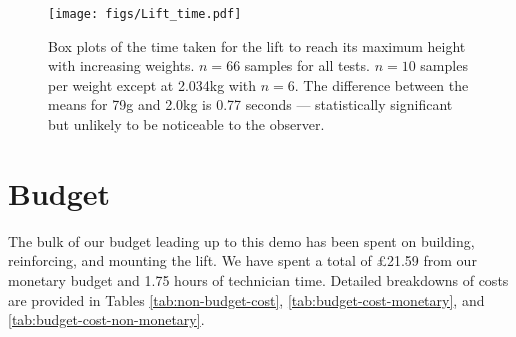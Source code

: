 \documentclass{article}
\begin{document}
\begin{figure}
  \begin{center}
    \texttt{[image: figs/Lift\_time.pdf]}
    \caption{Box plots of the time taken for the lift to reach its maximum height with increasing weights. $n = 66$ samples for all tests. $n = 10$ samples per weight except at 2.034kg with $n = 6$. The difference between the means for 79g and 2.0kg is 0.77 seconds --- statistically significant but unlikely to be noticeable to the observer.}
    \label{fig:weight-testing}
  \end{center}
\end{figure}

\section{Budget}
The bulk of our budget leading up to this demo has been spent on building, reinforcing, and mounting the lift. We have spent a total of \pounds 21.59 from our monetary budget and 1.75 hours of technician time. Detailed breakdowns of costs are provided in Tables \ref{tab:non-budget-cost}, \ref{tab:budget-cost-monetary}, and \ref{tab:budget-cost-non-monetary}.

\begin{table}[h]
\begin{center}
\caption{Non-budgeted monetary costs at demo \demoNumber.}
\label{tab:non-budget-cost}
\end{center}
\end{table}
\end{document}
